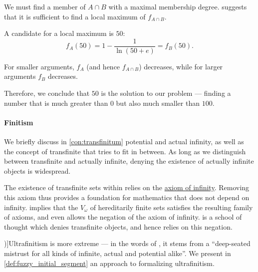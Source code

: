 \begin{example}
  We must find a member of \( A \cap B \) with a maximal membership degree.  suggests that it is sufficient to find a local maximum of \( f_{A \cap B} \).

  A candidate for a local maximum is \( 50 \):
  \begin{equation*}
    f_A(50) = 1 - \frac 1 {\ln(50 + e)} = f_B(50).
  \end{equation*}

  For smaller arguments, \( f_A \) (and hence \( f_{A \cap B} \)) decreases, while for larger arguments \( f_B \) decreases.

  Therefore, we conclude that \( 50 \) is the solution to our problem --- finding a number that is much greater than \( 0 \) but also much smaller than \( 100 \).
\end{example}

\paragraph{Finitism}

\begin{concept}\label{con:finitism}
  We briefly discuss in \cref{con:transfinitum} potential and actual infinity, as well as the concept of transfinite that tries to fit in between. As long as we distinguish between transfinite and actually infinite, denying the existence of actually infinite objects is widespread.

  The existence of transfinite sets within \hyperref[def:zfc]{} relies on the \hyperref[def:zfc/infinity]{axiom of infinity}. Removing this axiom thus provides a foundation for mathematics that does not depend on infinity.  implies that the \hyperref[def:universe_of_hereditary_finite_sets]{\( V_\omega \)} of hereditarily finite sets satisfies the resulting family of axioms, and even allows the negation of the axiom of infinity.  is a school of thought which denies transfinite objects, and hence relies on this negation.

  \term[en=ultrafinitism (\cite[2]{MannucciCherubin2006UltrafinitismI})]{Ultrafinitism} is more extreme --- in the words of \textcite{MannucciCherubin2006UltrafinitismI}, it stems from a \enquote{deep-seated mistrust for all kinds of infinite, actual and potential alike}. We present in \cref{def:fuzzy_initial_segment} an approach to formalizing ultrafinitism.
\end{concept}

